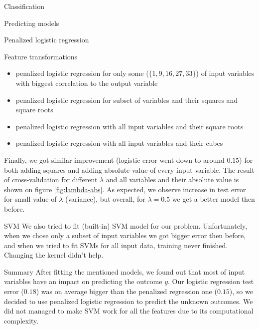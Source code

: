 \documentclass{article}
\begin{document}
\begin{section}{Classification}
\begin{subsection}{Predicting models}
\begin{subsubsection}{Penalized logistic regression}
\begin{subsubsection}{Feature transformations}
\begin{itemize}
\item penalized logistic regression for only some ($\{1, 9, 16, 27, 33\}$) of input variables with biggest correlation to the output variable
\item penalized logistic regression for subset of variables and their squares and square roots
\item penalized logistic regression with all input variables and their square roots
\item penalized logistic regression with all input variables and their cubes
\end{itemize}
Finally, we got similar improvement (logistic error went down to around $0.15$) for both adding squares and adding absolute value of every input variable. The result of cross-validation for different $\lambda$ and all variables and their absolute value is shown on figure \ref{fig:lambda-abs}. As expected, we observe increase in test error for small value of $\lambda$ (variance), but overall, for $\lambda = 0.5$ we get a better model then before.
\end{subsubsection}
\end{subsubsection}
\begin{subsubsection}{SVM}
We also tried to fit (built-in) SVM model for our problem. Unfortunately, when we chose only a subset of input variables we got bigger error then before, and when we tried to fit SVMs for all input data, training never finished. Changing the kernel didn't help.
\end{subsubsection}
\end{subsection}
\begin{subsection}{Summary}
After fitting the mentioned models, we found out that most of input variables have an impact on predicting the outcome $y$. Our logistic regression test error ($0.18$) was on average bigger than the penalized regression one ($0.15$), so we decided to use penalized logistic regression to predict the unknown outcomes. We did not managed to make SVM work for all the features due to its computational complexity.
\end{subsection}
\end{section}
\end{document}

